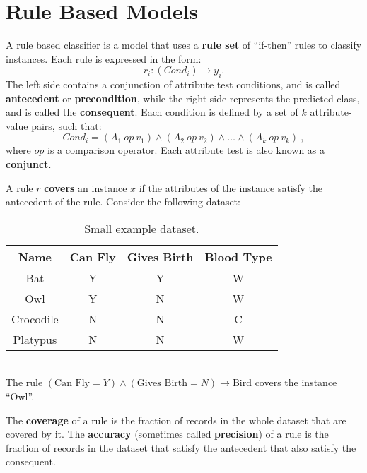 \chapter{Rule Based Models}

A rule based classifier is a model that uses a \textbf{rule set} of ``if-then'' rules to classify instances. Each rule is expressed in the form:
\begin{equation*}
    r_i : (\textit{Cond}_i) \rightarrow{} y_i.
\end{equation*}
The left side contains a conjunction of attribute test conditions, and is called \textbf{antecedent} or \textbf{precondition}, while the right side represents the predicted class, and is called the \textbf{consequent}. Each condition is defined by a set of $k$ attribute-value pairs, such that:
\begin{equation*}
    \textit{Cond}_i = (A_1 \ op \ v_1) \land (A_2 \ op \ v_2) \land \dots \land (A_k \ op \ v_k) \ ,
\end{equation*}
where $op$ is a comparison operator. Each attribute test is also known as a \textbf{conjunct}.

A rule $r$ \textbf{covers} an instance $x$ if the attributes of the instance satisfy the antecedent of the rule. Consider the following dataset:
\begin{table}[h]
    \centering
    \begin{tabular}{|c|c|c|c|}
    \hline
        Name & Can Fly & Gives Birth & Blood Type \\
    \hline
    \hline
        Bat & Y & Y & W \\
    \hline
        Owl & Y & N & W \\
    \hline
        Crocodile & N & N & C \\
    \hline
        Platypus & N & N & W \\
    \hline
    \end{tabular}
    \caption{Small example dataset.}
    \label{tab:small_dataset}
\end{table}
\\The rule $(\text{Can Fly} = Y) \land (\text{Gives Birth} = N) \rightarrow{} \text{Bird}$ covers the instance ``Owl''.

The \textbf{coverage} of a rule is the fraction of records in the whole dataset that are covered by it. The \textbf{accuracy} (sometimes called \textbf{precision}) of a rule is the fraction of records in the dataset that satisfy the antecedent that also satisfy the consequent.

